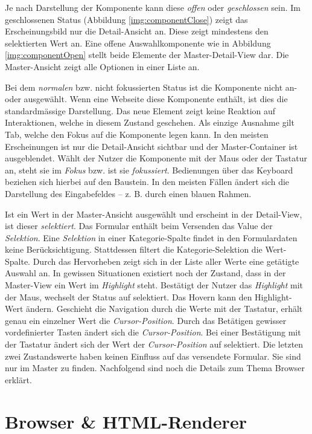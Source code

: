 Je nach Darstellung der Komponente kann diese \emph{offen} oder \emph{geschlossen} sein. 
Im geschlossenen Status (Abbildung \ref{img:componentClose}) zeigt das Erscheinungsbild nur die Detail-Ansicht an.
Diese zeigt mindestens den selektierten Wert an. 
Eine offene Auswahlkomponente wie in Abbildung \ref{img:componentOpen} stellt beide Elemente der Master-Detail-View dar. 
Die Master-Ansicht zeigt alle Optionen in einer Liste an. 

Bei dem \emph{normalen} bzw. nicht fokussierten Status ist die Komponente nicht an- oder ausgewählt. 
Wenn eine Webseite diese Komponente enthält, ist dies die standardmässige Darstellung. 
Das neue Element zeigt keine Reaktion auf Interaktionen, welche in diesem Zustand geschehen. 
Als einzige Ausnahme gilt Tab, welche den Fokus auf die Komponente legen kann. 
In den meisten Erscheinungen ist nur die Detail-Ansicht sichtbar und der Master-Container ist ausgeblendet. 
Wählt der Nutzer die Komponente mit der Maus oder der Tastatur an, steht sie im \emph{Fokus} bzw. ist sie \emph{fokussiert}. 
Bedienungen über das Keyboard beziehen sich hierbei auf den Baustein. 
In den meisten Fällen ändert sich die Darstellung des Eingabefeldes – z. B. durch einen blauen Rahmen. 

Ist ein Wert in der Master-Ansicht ausgewählt und erscheint in der Detail-View, ist dieser \emph{selektiert}. 
Das Formular enthält beim Versenden das Value der \emph{Selektion}. 
Eine \emph{Selektion} in einer Kategorie-Spalte findet in den Formulardaten keine Berücksichtigung. 
Stattdessen filtert die Kategorie-Selektion die Wert-Spalte. 
Durch das Hervorheben zeigt sich in der Liste aller Werte eine getätigte Auswahl an. 
In gewissen Situationen existiert noch der Zustand, dass in der Master-View ein Wert im \emph{Highlight} steht. 
Bestätigt der Nutzer das \emph{Highlight} mit der Maus, wechselt der Status auf selektiert. 
Das Hovern kann den Highlight-Wert ändern. 
Geschieht die Navigation durch die Werte mit der Tastatur, erhält genau ein einzelner Wert die \emph{Cursor-Position}. 
Durch das Betätigen gewisser vordefinierter Tasten ändert sich die \emph{Cursor-Position}. 
Bei einer Bestätigung mit der Tastatur ändert sich der Wert der \emph{Cursor-Position} auf selektiert. 
Die letzten zwei Zustandswerte haben keinen Einfluss auf das versendete Formular. 
Sie sind nur im Master zu finden. 
Nachfolgend sind noch die Details zum Thema Browser erklärt. 


\section{Browser \& HTML-Renderer}
\label{sec:browserRenderer}

